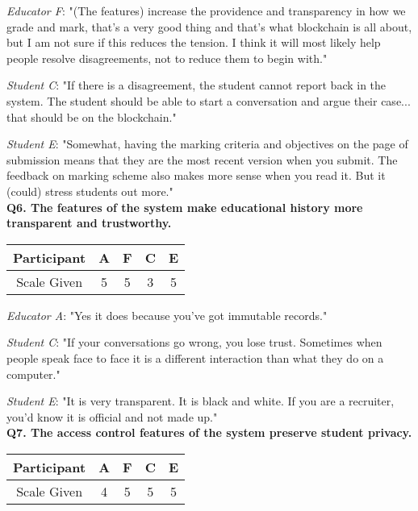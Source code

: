 \textit{Educator F}: "(The features) increase the providence and transparency in how we grade and mark,
that's a very good thing and that's what blockchain is all about, but I am not sure if this reduces the tension.
I think it will most likely help people resolve disagreements, not to reduce them to begin with."

\textit{Student C}: "If there is a disagreement, the student cannot report back in the system. The student should be
able to start a conversation and argue their case... that should be on the blockchain."

\textit{Student E}: "Somewhat, having the marking criteria and objectives on the page of submission means that they are the most  
recent version when you submit. The feedback on marking scheme also makes more sense when you read it. 
But it (could) stress students out more."\\

\textbf{Q6. The features of the system make educational history more transparent and trustworthy.}\\
\begin{table}[!ht]
	\centering
	\begin{tabularx}{0.325\textwidth}{|c|c|c|c|c|}
		\hline
		Participant & A                  & F                  & C                      & E \\
		\hline
		Scale Given & \cellcolor{green}5 & \cellcolor{green}5 & \cellcolor{Dandelion}3 & \cellcolor{green}5 \\
		\hline
	\end{tabularx}
\end{table}

\textit{Educator A}: "Yes it does because you've got immutable records."

\textit{Student C}: "If your conversations go wrong, you lose trust. Sometimes when people speak face to face
it is a different interaction than what they do on a computer."

\textit{Student E}: "It is very transparent. It is black and white. If you are a recruiter, you'd know it is official 
and not made up."\\

\textbf{Q7. The access control features of the system preserve student privacy.}\\
\begin{table}[!ht]
	\centering
	\begin{tabularx}{0.325\textwidth}{|c|c|c|c|c|}
		\hline
		Participant & A                        & F                  & C                  & E \\
		\hline
		Scale Given & \cellcolor{SpringGreen}4 & \cellcolor{green}5 & \cellcolor{green}5 & \cellcolor{green}5 \\
		\hline
	\end{tabularx}
\end{table}

